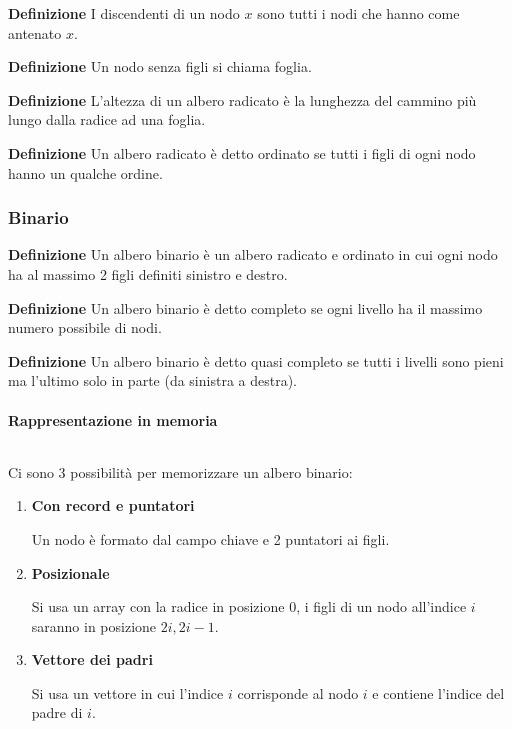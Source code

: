 \documentclass{article}
\begin{document}
\noindent\textbf{Definizione} I discendenti di un nodo $x$ sono tutti i nodi che hanno come antenato $x$.\newline

\noindent\textbf{Definizione} Un nodo senza figli si chiama foglia.\newline

\noindent\textbf{Definizione} L'altezza di un albero radicato è la lunghezza del cammino più lungo dalla radice ad una foglia.\newline

\noindent\textbf{Definizione} Un albero radicato è detto ordinato se tutti i figli di ogni nodo hanno un qualche ordine.\newline

\newpage

\subsubsection{Binario}

\noindent\textbf{Definizione} Un albero binario è un albero radicato e ordinato in cui ogni nodo ha al massimo 2 figli definiti sinistro e destro.\newline

\noindent\textbf{Definizione} Un albero binario è detto completo se ogni livello ha il massimo numero possibile di nodi.\newline

\noindent\textbf{Definizione} Un albero binario è detto quasi completo se tutti i livelli sono pieni ma l'ultimo solo in parte (da sinistra a destra).\newline

\paragraph{Rappresentazione in memoria} $\ $\newline

\noindent Ci sono 3 possibilità per memorizzare un albero binario:
\begin{enumerate}
    \item \textbf{Con record e puntatori}

    Un nodo è formato dal campo chiave e 2 puntatori ai figli.

    \item \textbf{Posizionale} 

    Si usa un array con la radice in posizione 0, i figli di un nodo all'indice $i$ saranno in posizione $2i,2i-1$.

    \item \textbf{Vettore dei padri}

    Si usa un vettore in cui l'indice $i$ corrisponde al nodo $i$ e contiene l'indice del padre di $i$.
    
\end{enumerate}
\end{document}
